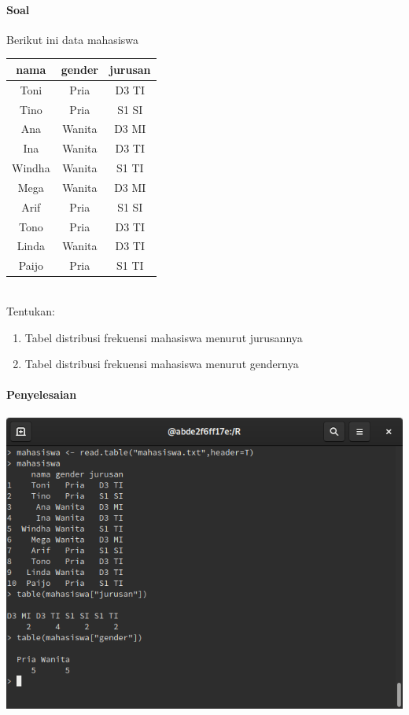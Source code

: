 \documentclass[a4paper,12pt]{article}
\begin{document}
\paragraph{Soal\\}
Berikut ini data mahasiswa\\
\begin{table}[!ht]
	\begin{tabular}{|c|c|c|}
		\hline 
		nama & {gender} & {jurusan} \\ 
		\hline 
		Toni & Pria & D3 TI \\ 
		\hline 
		Tino & Pria & S1 SI \\ 
		\hline 
		Ana & Wanita & D3 MI \\ 
		\hline 
		Ina & Wanita & D3 TI \\ 
		\hline 
		Windha & Wanita & S1 TI \\ 
		\hline 
		Mega & Wanita & D3 MI \\ 
		\hline 
		Arif & Pria & S1 SI \\ 
		\hline 
		Tono &  Pria & D3 TI \\ 
		\hline 
		Linda & Wanita & D3 TI \\ 
		\hline 
		Paijo & Pria & S1 TI \\ 
		\hline 
	\end{tabular}
\end{table}\\
Tentukan:
\begin{enumerate}
	\item Tabel distribusi frekuensi mahasiswa menurut jurusannya
	\item Tabel distribusi frekuensi mahasiswa menurut gendernya
\end{enumerate}
\paragraph{Penyelesaian\\}
 
\includegraphics[width=\linewidth]{5}
\end{document}
